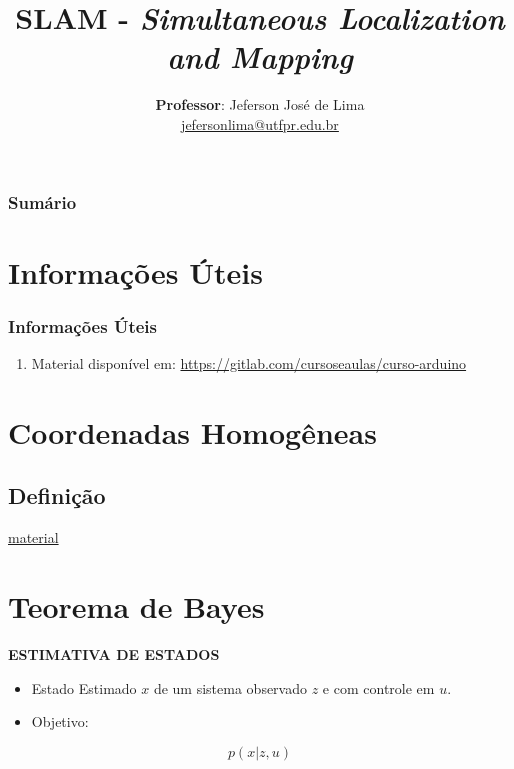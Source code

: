 \documentclass[t]{beamer}
\title[SLAM]{
  SLAM - \textit{Simultaneous Localization and Mapping}}
\author[Prof. Jeferson José de Lima]{
  \textbf{Professor}: Jeferson José de Lima\\  \medskip
  {\url{jefersonlima@utfpr.edu.br}}}
\institute[UTFPR-PB]{Departamento de Informática (DAINF-PB)}
\date[2019.2]
\newcommand{\titleSlide}[1]{\textbf{\MakeUppercase{#1}}}
\begin{document}
\begin{frame}
  \titlepage
\end{frame}

\begin{frame}
  \frametitle{Sumário}
  {\small {\small \tableofcontents}}
\end{frame}

\section{Informações Úteis}
  \frametitle{Informações Úteis}
\begin{frame}

\begin{enumerate}
\item Material disponível em: \href{https://gitlab.com/cursoseaulas/curso-arduino}{https://gitlab.com/cursoseaulas/curso-arduino} 
\end{enumerate}

\end{frame}

\section{Coordenadas Homogêneas}
\subsection{Definição}
\begin{frame}
  \href{http://www.joinville.ifsc.edu.br/~michael.klug/ROB74/Aulas/aula2_trans_geometricas.pdf
  }{material}
\end{frame}
\section{Teorema de Bayes}
\begin{frame}
  \titleSlide{Estimativa de Estados}

  \begin{itemize}
    \item Estado Estimado $x$ de um sistema observado $z$ e com controle em $u$.
    \item Objetivo:
  \end{itemize}

  \begin{equation}
    p(x|z,u)
  \end{equation}

\end{frame}
\end{document}

